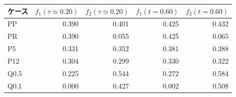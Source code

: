 \begin{tabular}{lrrrr}\toprule
ケース & $f_1(\tau\simeq0.20)$ & $f_2(\tau\simeq0.20)$ & $f_1(t=0.60)$ & $f_2(t=0.60)$ \\
\midrule
PP & 0.390 & 0.401 & 0.425 & 0.432 \\
PR & 0.390 & 0.055 & 0.425 & 0.065 \\
P5 & 0.331 & 0.352 & 0.381 & 0.388 \\
P12 & 0.304 & 0.299 & 0.330 & 0.322 \\
Q0.5 & 0.225 & 0.544 & 0.272 & 0.584 \\
Q0.1 & 0.000 & 0.427 & 0.002 & 0.508 \\
\bottomrule\end{tabular}
